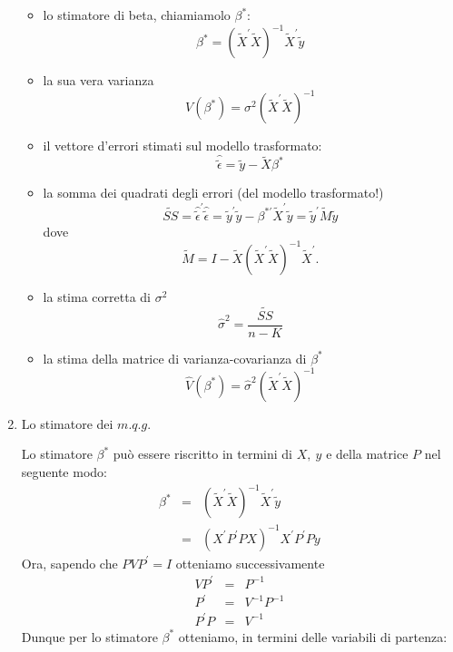 \documentclass[a4paper]{report}
\theoremstyle{remark}
\begin{document}
\begin{enumerate}
\begin{itemize}
\item lo stimatore di beta, chiamiamolo $\beta ^{\ast }$: 
\begin{equation*}
\beta ^{\ast }=(\tilde{X}^{\prime }\tilde{X})^{-1}\tilde{X}^{\prime }\tilde{y%
}
\end{equation*}

\item la sua vera varianza 
\begin{equation*}
V(\beta ^{\ast })=\sigma ^{2}(\tilde{X}^{\prime }\tilde{X})^{-1}
\end{equation*}

\item il vettore d'errori stimati sul modello trasformato: 
\begin{equation*}
\hat{\tilde{\epsilon}}=\tilde{y}-\tilde{X}\beta ^{\ast }
\end{equation*}

\item la somma dei quadrati degli errori (del modello trasformato!) 
\begin{equation*}
\tilde{SS}={\hat{\tilde{\epsilon}}}^{\prime }\hat{\tilde{\epsilon}}=\tilde{y}%
^{\prime }\tilde{y}-{\beta ^{\ast \prime }}\tilde{X}^{\prime }\tilde{y}=%
\tilde{y}^{\prime }\tilde{M}\tilde{y}
\end{equation*}%
dove 
\begin{equation*}
\tilde{M}=I-\tilde{X}(\tilde{X}^{\prime }\tilde{X})^{-1}\tilde{X}^{\prime }.
\end{equation*}

\item la stima corretta di $\sigma ^{2}$ 
\begin{equation*}
\hat{\sigma}^{2}=\dfrac{\tilde{SS}}{n-K}
\end{equation*}

\item la stima della matrice di varianza-covarianza di $\beta ^{\ast }$ 
\begin{equation*}
\hat{V}(\beta ^{\ast })=\hat{\sigma}^{2}(\tilde{X}^{\prime }\tilde{X})^{-1}
\end{equation*}
\end{itemize}

\item Lo stimatore dei $m.q.g.$

Lo stimatore $\beta ^{\ast }$ pu\`{o} essere riscritto in termini di $X,\ y$
e della matrice $P$ nel seguente modo: 
\begin{eqnarray*}
\beta ^{\ast } &=&(\tilde{X}^{\prime }\tilde{X})^{-1}\tilde{X}^{\prime }%
\tilde{y} \\
&=&(X^{\prime }P^{\prime }PX)^{-1}X^{\prime }P^{\prime }Py
\end{eqnarray*}%
Ora, sapendo che $PVP^{\prime }=I$ otteniamo successivamente 
\begin{eqnarray*}
VP^{\prime } &=&P^{-1} \\
P^{\prime } &=&V^{-1}P^{-1} \\
P^{\prime }P &=&V^{-1}
\end{eqnarray*}%
Dunque per lo stimatore $\beta ^{\ast }$ otteniamo, in termini delle
variabili di partenza:


\end{enumerate}
\end{document}
